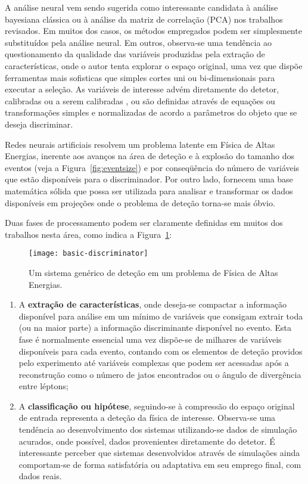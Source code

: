 A análise neural vem sendo sugerida como interessante candidata à análise
bayesiana clássica ou à análise da matriz de correlação (PCA) nos trabalhos
revisados. Em muitos dos casos, os métodos empregados podem ser simplesmente
substituídos pela análise neural. Em outros, observa-se uma tendência ao
questionamento da qualidade das variáveis produzidas pela extração de
características, onde o autor tenta explorar o espaço original, uma vez que
dispõe ferramentas mais sofisticas que simples cortes uni ou bi-dimensionais
para executar a seleção. As variáveis de interesse advém diretamente do
detetor, calibradas ou a serem calibradas \cite{silva-acat-2001}, ou são
definidas através de equações ou transformações simples e normalizadas de
acordo a parâmetros do objeto que se deseja discriminar.

Redes neurais artificiais resolvem um problema latente em Física de Altas
Energias, inerente aos avanços na área de deteção e à explosão do tamanho dos
eventos (veja a Figura~\ref{fig:eventsize}) e por conseqüência do número de
variáveis que estão disponíveis para o discriminador. Por outro lado, fornecem
uma base matemática sólida que possa ser utilizada para analisar e transformar
os dados disponíveis em projeções onde o problema de deteção torna-se mais
óbvio.

Duas fases de processamento podem ser claramente definidas em muitos dos
trabalhos nesta área, como indica a Figura~\ref{fig:basic-discriminator}:

\begin{figure}
\begin{center}
\texttt{[image: basic-discriminator]}
\end{center}
\caption{Um sistema genérico de deteção em um problema de Física de Altas Energias.}
\label{fig:basic-discriminator}
\end{figure}

\begin{enumerate}
\item A \textbf{extração de características}, onde deseja-se compactar a
informação disponível para análise em um mínimo de variáveis que consigam
extrair toda (ou na maior parte) a informação discriminante disponível no
evento. Esta fase é normalmente essencial uma vez dispõe-se de milhares de
variáveis disponíveis para cada evento, contando com os elementos de deteção
providos pelo experimento até variáveis complexas que podem ser acessadas após
a reconstrução como o número de jatos encontrados ou o ângulo de divergência
entre léptons;
\item A \textbf{classificação ou hipótese}, seguindo-se à compressão do espaço
original de entrada representa a deteção da física de interesse. Observa-se uma
tendência ao desenvolvimento dos sistemas utilizando-se dados de simulação
acurados, onde possível, dados provenientes diretamente do detetor. É
interessante perceber que sistemas desenvolvidos através de simulações ainda
comportam-se de forma satisfatória ou adaptativa em seu emprego final, com
dados reais.
\end{enumerate}

